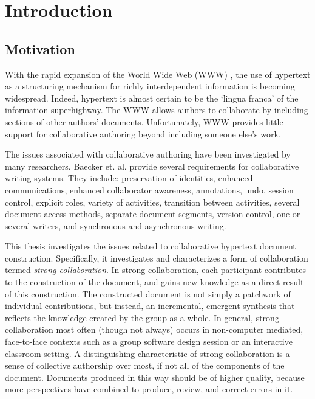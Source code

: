 

\chapter{Introduction}
\label{sec:introduction}

\section{Motivation}

With the rapid expansion of the World Wide Web (WWW) \cite{Berners-Lee94},
the use of hypertext as a structuring mechanism for richly interdependent
information is becoming widespread.  Indeed, hypertext is almost certain to
be the `lingua franca' of the information superhighway.  The WWW allows
authors to collaborate by including sections of other authors' documents.
Unfortunately, WWW provides little support for collaborative authoring
beyond including someone else's work.

The issues associated with collaborative authoring have been investigated
by many researchers.  Baecker et. al. \cite{Baecker93} provide several
requirements for collaborative writing systems.  They include: preservation
of identities, enhanced communications, enhanced collaborator awareness,
annotations, undo, session control, explicit roles, variety of activities,
transition between activities, several document access methods, separate
document segments, version control, one or several writers, and synchronous
and asynchronous writing.

This thesis investigates the issues related to collaborative hypertext
document construction.  Specifically, it investigates and characterizes a
form of collaboration termed {\em strong collaboration}.  In strong
collaboration, each participant contributes to the construction of the
document, and gains new knowledge as a direct result of this construction.
The constructed document is not simply a patchwork of individual
contributions, but instead, an incremental, emergent synthesis that
reflects the knowledge created by the group as a whole.  In general,
strong collaboration most often (though not always) occurs in non-computer
mediated, face-to-face contexts such as a group software design session or
an interactive classroom setting.  A distinguishing characteristic of strong
collaboration is a sense of collective authorship over most, if not all of
the components of the document.  Documents produced in this way should be of
higher quality, because more perspectives have combined to produce, review,
and correct errors in it.

